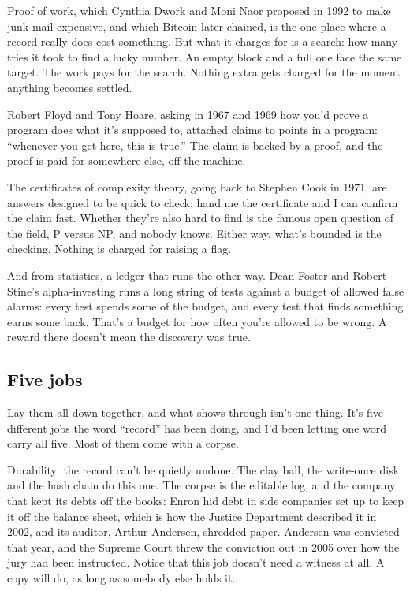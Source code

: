 \documentclass[11pt,twoside]{article}
\theoremstyle{thielethm}
\theoremstyle{thieledef}
\theoremstyle{thieledef}
\theoremstyle{thieledef}
\theoremstyle{thielethm}
\theoremstyle{thieleobs}
\theoremstyle{thielethm}
\begin{document}
Proof of work, which Cynthia Dwork and Moni Naor proposed in 1992 to make junk mail expensive, and which Bitcoin later chained, is the one place where a record really does cost something. But what it charges for is a search: how many tries it took to find a lucky number. An empty block and a full one face the same target. The work pays for the search. Nothing extra gets charged for the moment anything becomes settled.

Robert Floyd and Tony Hoare, asking in 1967 and 1969 how you'd prove a program does what it's supposed to, attached claims to points in a program: ``whenever you get here, this is true.'' The claim is backed by a proof, and the proof is paid for somewhere else, off the machine.

The certificates of complexity theory, going back to Stephen Cook in 1971, are answers designed to be quick to check: hand me the certificate and I can confirm the claim fast. Whether they're also hard to find is the famous open question of the field, P versus NP, and nobody knows. Either way, what's bounded is the checking. Nothing is charged for raising a flag.

And from statistics, a ledger that runs the other way. Dean Foster and Robert Stine's alpha-investing runs a long string of tests against a budget of allowed false alarms: every test spends some of the budget, and every test that finds something earns some back. That's a budget for how often you're allowed to be wrong. A reward there doesn't mean the discovery was true.

\subsection{Five jobs}

Lay them all down together, and what shows through isn't one thing. It's five different jobs the word ``record'' has been doing, and I'd been letting one word carry all five. Most of them come with a corpse.

Durability: the record can't be quietly undone. The clay ball, the write-once disk and the hash chain do this one. The corpse is the editable log, and the company that kept its debts off the books: Enron hid debt in side companies set up to keep it off the balance sheet, which is how the Justice Department described it in 2002, and its auditor, Arthur Andersen, shredded paper. Andersen was convicted that year, and the Supreme Court threw the conviction out in 2005 over how the jury had been instructed. Notice that this job doesn't need a witness at all. A copy will do, as long as somebody else holds it.
\end{document}
